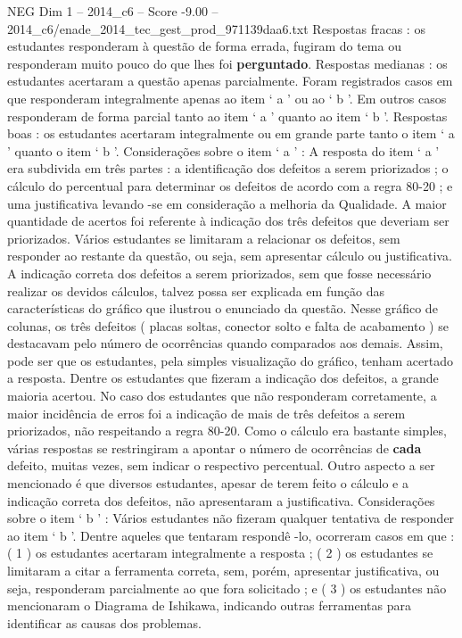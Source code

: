 \begin{textsample}{NEG Dim 1 – 2014\_c6 – Score -9.00 – 2014\_c6/enade\_2014\_tec\_gest\_prod\_971139daa6.txt}
Respostas fracas : os estudantes responderam à questão de forma errada, fugiram do tema ou responderam muito pouco do que lhes foi \textbf{perguntado}.
Respostas medianas : os estudantes acertaram a questão apenas parcialmente.
Foram registrados casos em que responderam integralmente apenas ao item ‘ a ’ ou ao ‘ b ’.
Em outros casos responderam de forma parcial tanto ao item ‘ a ’ quanto ao item ‘ b ’.
Respostas boas : os estudantes acertaram integralmente ou em grande parte tanto o item ‘ a ’ quanto o item ‘ b ’.
Considerações sobre o item ‘ a ’ : A resposta do item ‘ a ’ era subdivida em três partes : a identificação dos defeitos a serem priorizados ; o cálculo do percentual para determinar os defeitos de acordo com a regra 80-20 ; e uma justificativa levando -se em consideração a melhoria da Qualidade.
A maior quantidade de acertos foi referente à indicação dos três defeitos que deveriam ser priorizados.
Vários estudantes se limitaram a relacionar os defeitos, sem responder ao restante da questão, ou seja, sem apresentar cálculo ou justificativa.
A indicação correta dos defeitos a serem priorizados, sem que fosse necessário realizar os devidos cálculos, talvez possa ser explicada em função das características do gráfico que ilustrou o enunciado da questão.
Nesse gráfico de colunas, os três defeitos ( placas soltas, conector solto e falta de acabamento ) se destacavam pelo número de ocorrências quando comparados aos demais.
Assim, pode ser que os estudantes, pela simples visualização do gráfico, tenham acertado a resposta.
Dentre os estudantes que fizeram a indicação dos defeitos, a grande maioria acertou.
No caso dos estudantes que não responderam corretamente, a maior incidência de erros foi a indicação de mais de três defeitos a serem priorizados, não respeitando a regra 80-20.
Como o cálculo era bastante simples, várias respostas se restringiram a apontar o número de ocorrências de \textbf{cada} defeito, muitas vezes, sem indicar o respectivo percentual.
Outro aspecto a ser mencionado é que diversos estudantes, apesar de terem feito o cálculo e a indicação correta dos defeitos, não apresentaram a justificativa.
Considerações sobre o item ‘ b ’ : Vários estudantes não fizeram qualquer tentativa de responder ao item ‘ b ’.
Dentre aqueles que tentaram respondê -lo, ocorreram casos em que : ( 1 ) os estudantes acertaram integralmente a resposta ; ( 2 ) os estudantes se limitaram a citar a ferramenta correta, sem, porém, apresentar justificativa, ou seja, responderam parcialmente ao que fora solicitado ; e ( 3 ) os estudantes não mencionaram o Diagrama de Ishikawa, indicando outras ferramentas para identificar as causas dos problemas.

\end{textsample}
